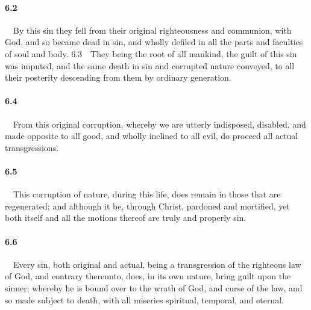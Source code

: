 \paragraph{6.2}\ \ By this sin they fell from their original righteousness and communion, with God, and so became dead in sin, and wholly defiled in all the parts and faculties of soul and body.  6.3\ \ They being the root of all mankind, the guilt of this sin was imputed, and the same death in sin and corrupted nature conveyed, to all their posterity descending from them by ordinary generation.   
\bigskip
\paragraph{6.4}\ \ From this original corruption, whereby we are utterly indisposed, disabled, and made opposite to all good, and wholly inclined to all evil, do proceed all actual transgressions.   
\bigskip
\paragraph{6.5}\ \ This corruption of nature, during this life, does remain in those that are regenerated; and although it be, through Christ, pardoned and mortified, yet both itself and all the motions thereof are truly and properly sin.   
\bigskip
\paragraph{6.6}\ \ Every sin, both original and actual, being a transgression of the righteous law of God, and contrary thereunto, does, in its own nature, bring guilt upon the sinner; whereby he is bound over to the wrath of God, and curse of the law, and so made subject to death, with all miseries spiritual, temporal, and eternal.  

